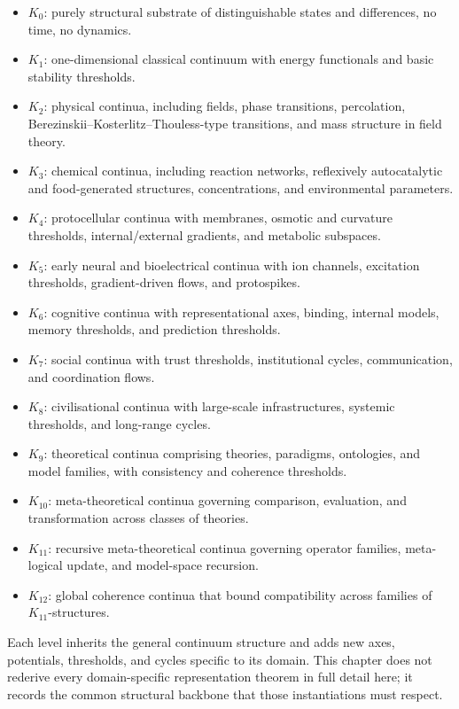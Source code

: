 \begin{itemize}
    \item \(K_0\): purely structural substrate of distinguishable states and differences, no time, no dynamics.
    \item \(K_1\): one-dimensional classical continuum with energy functionals and basic stability thresholds.
    \item \(K_2\): physical continua, including fields, phase transitions, percolation, Berezinskii--Kosterlitz--Thouless-type transitions, and mass structure in field theory.
    \item \(K_3\): chemical continua, including reaction networks, reflexively autocatalytic and food-generated structures, concentrations, and environmental parameters.
    \item \(K_4\): protocellular continua with membranes, osmotic and curvature thresholds, internal/external gradients, and metabolic subspaces.
    \item \(K_5\): early neural and bioelectrical continua with ion channels, excitation thresholds, gradient-driven flows, and protospikes.
    \item \(K_6\): cognitive continua with representational axes, binding, internal models, memory thresholds, and prediction thresholds.
    \item \(K_7\): social continua with trust thresholds, institutional cycles, communication, and coordination flows.
    \item \(K_8\): civilisational continua with large-scale infrastructures, systemic thresholds, and long-range cycles.
    \item \(K_9\): theoretical continua comprising theories, paradigms, ontologies, and model families, with consistency and coherence thresholds.
    \item \(K_{10}\): meta-theoretical continua governing comparison, evaluation, and transformation across classes of theories.
    \item \(K_{11}\): recursive meta-theoretical continua governing operator families, meta-logical update, and model-space recursion.
    \item \(K_{12}\): global coherence continua that bound compatibility across families of \(K_{11}\)-structures.
\end{itemize}

Each level inherits the general continuum structure and adds new axes, potentials, thresholds, and cycles specific to its domain.
This chapter does not rederive every domain-specific representation theorem in
full detail here; it records the common structural backbone that those
instantiations must respect.

